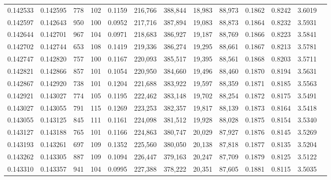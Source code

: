 \begin{tabular}{rrrrrrrrrrrrr}
0.142533 & 0.142595 &   778 & 102 &                                     0.1159 & 216,766 & 388,844 &  18,983 &  88,973 & 0.1862 & 0.8242 & 3.6019 \\
0.142597 & 0.142643 &   950 & 100 &                                     0.0952 & 217,716 & 387,894 &  19,083 &  88,873 & 0.1864 & 0.8232 & 3.5931 \\
0.142644 & 0.142701 &   967 & 104 &                                     0.0971 & 218,683 & 386,927 &  19,187 &  88,769 & 0.1866 & 0.8223 & 3.5841 \\
0.142702 & 0.142744 &   653 & 108 &                                     0.1419 & 219,336 & 386,274 &  19,295 &  88,661 & 0.1867 & 0.8213 & 3.5781 \\
0.142747 & 0.142820 &   757 & 100 &                                     0.1167 & 220,093 & 385,517 &  19,395 &  88,561 & 0.1868 & 0.8203 & 3.5711 \\
0.142821 & 0.142866 &   857 & 101 &                                     0.1054 & 220,950 & 384,660 &  19,496 &  88,460 & 0.1870 & 0.8194 & 3.5631 \\
0.142867 & 0.142920 &   738 & 101 &                                     0.1204 & 221,688 & 383,922 &  19,597 &  88,359 & 0.1871 & 0.8185 & 3.5563 \\
0.142921 & 0.143027 &   774 & 105 &                                     0.1195 & 222,462 & 383,148 &  19,702 &  88,254 & 0.1872 & 0.8175 & 3.5491 \\
0.143027 & 0.143055 &   791 & 115 &                                     0.1269 & 223,253 & 382,357 &  19,817 &  88,139 & 0.1873 & 0.8164 & 3.5418 \\
0.143055 & 0.143125 &   845 & 111 &                                     0.1161 & 224,098 & 381,512 &  19,928 &  88,028 & 0.1875 & 0.8154 & 3.5340 \\
0.143127 & 0.143188 &   765 & 101 &                                     0.1166 & 224,863 & 380,747 &  20,029 &  87,927 & 0.1876 & 0.8145 & 3.5269 \\
0.143193 & 0.143261 &   697 & 109 &                                     0.1352 & 225,560 & 380,050 &  20,138 &  87,818 & 0.1877 & 0.8135 & 3.5204 \\
0.143262 & 0.143305 &   887 & 109 &                                     0.1094 & 226,447 & 379,163 &  20,247 &  87,709 & 0.1879 & 0.8125 & 3.5122 \\
0.143310 & 0.143357 &   941 & 104 &                                     0.0995 & 227,388 & 378,222 &  20,351 &  87,605 & 0.1881 & 0.8115 & 3.5035 \\

\end{tabular}
